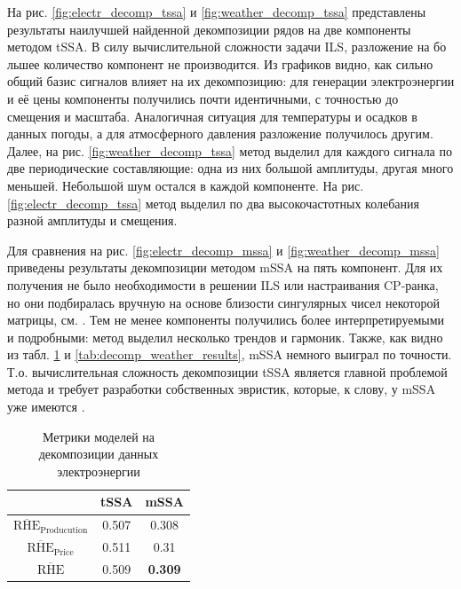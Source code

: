 	На рис. \ref{fig:electr_decomp_tssa} и \ref{fig:weather_decomp_tssa} представлены результаты наилучшей найденной декомпозиции рядов на две компоненты методом tSSA. В силу вычислительной сложности задачи ILS, разложение на б$\acute{\text{о}}$льшее количество компонент не производится. Из графиков видно, как сильно общий базис сигналов влияет на их декомпозицию: для генерации электроэнергии и её цены компоненты получились почти идентичными, с точностью до смещения и масштаба. Аналогичная ситуация для температуры и осадков в данных погоды, а для атмосферного давления разложение получилось другим. Далее, на рис. \ref{fig:weather_decomp_tssa} метод выделил для каждого сигнала по две периодические составляющие: одна из них большой амплитуды, другая много меньшей. Небольшой шум остался в каждой компоненте. На рис. \ref{fig:electr_decomp_tssa} метод выделил по два высокочастотных колебания разной амплитуды и смещения.
	
	Для сравнения на рис. \ref{fig:electr_decomp_mssa} и \ref{fig:weather_decomp_mssa} приведены результаты декомпозиции методом mSSA на пять компонент. Для их получения не было необходимости в решении ILS или настраивания CP-ранка, но они подбиралась вручную на основе близости сингулярных чисел некоторой матрицы, см. \cite{ecfb9dc578be43ae9ee8fc88b8ff9151}. Тем не менее компоненты получились более интерпретируемыми и подробными: метод выделил несколько трендов и гармоник. Также, как видно из табл. \ref{tab:decomp_electr_results} и \ref{tab:decomp_weather_results}, mSSA немного выиграл по точности. Т.о. вычислительная сложность декомпозиции tSSA является главной проблемой метода и требует разработки собственных эвристик, которые, к слову, у mSSA уже имеются \cite{ecfb9dc578be43ae9ee8fc88b8ff9151}.	
	
	\def\arraystretch{1.2}
	\begin{table}[h!]
		\centering
		\caption{Метрики моделей на декомпозиции данных электроэнергии}\label{tab:decomp_electr_results}
		\begin{tabular}{|c|c|c|}
			\hline
			& tSSA  & mSSA           \\ \hline
			$ \overline{\text{RHE}}_{\text{Producution}} $  & 0.507 & 0.308          \\ \hline
			$ \overline{\text{RHE}}_{\text{Price}} $      & 0.511 & 0.31           \\ \hline
			$ \overline{\text{RHE}} $             & 0.509 & \textbf{0.309} \\ \hline
		\end{tabular}
	\end{table}
	
